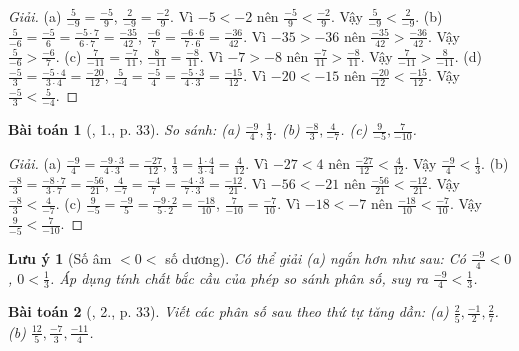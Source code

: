 \documentclass{article}
\newtheorem{baitoan}{Bài toán}
\newtheorem{luuy}{Lưu ý}
\begin{document}
\begin{proof}[Giải]
	(a) $\frac{5}{-9} = \frac{-5}{9}$, $\frac{2}{-9} = \frac{-2}{9}$. Vì $-5 < -2$ nên $\frac{-5}{9} < \frac{-2}{9}$. Vậy $\frac{5}{-9} < \frac{2}{-9}$. (b) $\frac{5}{-6} = \frac{-5}{6} = \frac{-5\cdot7}{6\cdot7} = \frac{-35}{42}$, $\frac{-6}{7} = \frac{-6\cdot6}{7\cdot6} = \frac{-36}{42}$. Vì $-35 > -36$ nên $\frac{-35}{42} > \frac{-36}{42}$. Vậy $\frac{5}{-6} > \frac{-6}{7}$. (c) $\frac{7}{-11} = \frac{-7}{11}$, $\frac{8}{-11} = \frac{-8}{11}$. Vì $-7 > -8$ nên $\frac{-7}{11} > \frac{-8}{11}$. Vậy $\frac{7}{-11} > \frac{8}{-11}$. (d) $\frac{-5}{3} = \frac{-5\cdot4}{3\cdot4} = \frac{-20}{12}$, $\frac{5}{-4} = \frac{-5}{4} = \frac{-5\cdot3}{4\cdot3} = \frac{-15}{12}$. Vì $-20 < -15$ nên $\frac{-20}{12} < \frac{-15}{12}$. Vậy $\frac{-5}{3} < \frac{5}{-4}$.
\end{proof}

\begin{baitoan}[\cite{SGK_Toan_6_Canh_Dieu_tap_2}, 1., p. 33]
	So sánh: (a) $\frac{-9}{4},\frac{1}{3}$. (b) $\frac{-8}{3},\frac{4}{-7}$. (c) $\frac{9}{-5},\frac{7}{-10}$.
\end{baitoan}

\begin{proof}[Giải]
	(a) $\frac{-9}{4} = \frac{-9\cdot3}{4\cdot3} = \frac{-27}{12}$, $\frac{1}{3} = \frac{1\cdot4}{3\cdot4} = \frac{4}{12}$. Vì $-27 < 4$ nên $\frac{-27}{12} < \frac{4}{12}$. Vậy $\frac{-9}{4} < \frac{1}{3}$. (b) $\frac{-8}{3} = \frac{-8\cdot7}{3\cdot7} = \frac{-56}{21}$, $\frac{4}{-7} = \frac{-4}{7} = \frac{-4\cdot3}{7\cdot3} = \frac{-12}{21}$. Vì $-56 < -21$ nên $\frac{-56}{21} < \frac{-12}{21}$. Vậy $\frac{-8}{3} < \frac{4}{-7}$. (c) $\frac{9}{-5} = \frac{-9}{5} = \frac{-9\cdot2}{5\cdot2} = \frac{-18}{10}$, $\frac{7}{-10} = \frac{-7}{10}$. Vì $-18 < -7$ nên $\frac{-18}{10} < \frac{-7}{10}$. Vậy $\frac{9}{-5} < \frac{7}{-10}$.
\end{proof}

\begin{luuy}[Số âm $< 0 <$ số dương]
	Có thể giải (a) ngắn hơn như sau: Có $\frac{-9}{4} < 0$, $0 < \frac{1}{3}$. Áp dụng tính chất bắc cầu của phép so sánh phân số, suy ra $\frac{-9}{4} < \frac{1}{3}$.
\end{luuy}

\begin{baitoan}[\cite{SGK_Toan_6_Canh_Dieu_tap_2}, 2., p. 33]
	Viết các phân số sau theo thứ tự tăng dần: (a) $\frac{2}{5},\frac{-1}{2},\frac{2}{7}$. (b) $\frac{12}{5},\frac{-7}{3},\frac{-11}{4}$.
\end{baitoan}
\end{document}
